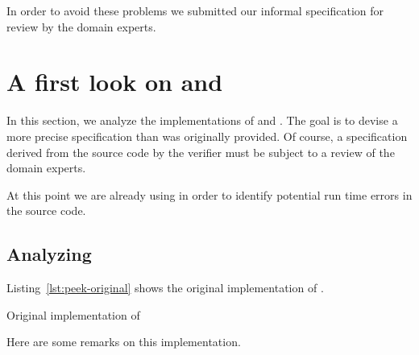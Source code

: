 In order to avoid these problems we submitted our informal specification
for review by the domain experts.

\clearpage

\section{A first look on \peek and \poke}
\label{sec:bitwalker-first-look}

In this section, we analyze the implementations of \peek 
and \poke.
The goal is to devise a more precise specification than
was originally provided.
Of course, a specification derived from the source code by the verifier
must be subject to a review of the domain experts.

At this point we are already using \framacwp in order to identify
potential run time errors in the source code.

\subsection{Analyzing \peek}
\label{sec:bitwalker-peek-first-look}

Listing~\ref{lst:peek-original} shows the original implementation of \peek.


\begin{listing}[hbt]
\begin{minipage}{\textwidth}

\end{minipage}
\caption{\label{lst:peek-original} Original implementation of \peek}
\end{listing}

Here are some remarks on this implementation.

